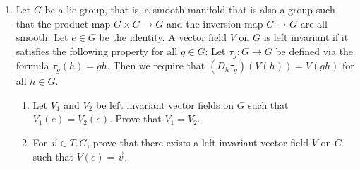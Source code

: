 \documentclass{article}
\begin{document}
\begin{enumerate}[label={\bf Q\arabic*:}]
\begin{enumerate}
\begin{proof}
          Then we have
          \begin{align*}
            \delta(f) &=\delta(f\restriction U) \\
              &=\delta(((f\circ\phi^{-1})\circ\phi)\restriction U) \\
              &=\delta(r+\sum_{i=1}^n(\pi_i\circ\phi)(f_i\circ\phi)) &
                (\because f\circ\phi^{-1} =r+\sum_{i=1}^n\pi_if_i) \\
              &=\delta(r+\sum_{i=1}^n\Pi_iF_i) & \\
              &=\delta(r)+\sum_{i=1}^n\delta(\Pi_iF_i) \\
              &=\sum_{i=1}^n\left[\delta(\Pi_i)F_i(p)
                +\Pi_i(p)\delta(F_i)\right] \\
              &=\sum_{i=1}^n\delta(\Pi_i)F_i(p) & (\because
                \Pi_i(p)=(\pi_i\circ\phi)(p)=\pi_i(\bar{0})=\bar{0}) \\
              &=\sum_{i=1}^n\delta(\Pi_i)(f_i\circ\phi)(p) \\
              &=\sum_{i=1}^n\delta(\Pi_i)f_i(\bar{0}) \\
              &=\sum_{i=1}^n\delta(\Pi_i)
                \left.\frac{\partial}{\partial
                x_i}\left[\sum_{j=1}^nx_jf_j(\bar{x})\right]\right
                \rvert_{\bar{0}} \\
              &=\sum_{i=1}^n\delta(\Pi_i)
                \left[\left.\frac{\partial(f\circ\phi^{-1})}{\partial
                x_i}\right\rvert_{\bar{0}}\right] \\
              &=D_p(f\circ\phi^{-1})(v) &(\text{for some}\;
                v=(\delta(\pi_1),\ldots,\delta(\pi_n))\in T_pM^n) \\
              &=\delta_{\vec{v}}(f). \\
          \end{align*}
          Thus, $\delta=\Psi(\vec{v})$, and since
          $\delta\in\text{Der}_pM^n$ was arbitrary, $\Psi$ is surjective.
        \end{proof}
    \end{enumerate}

  \item Let $G$ be a lie group, that is, a smooth manifold that is also a
    group such that the product map $G\times G\to G$ and the inversion map
    $G\to G$ are all smooth. Let $e\in G$ be the identity. A vector field
    $V$ on $G$ is left invariant if it satisfies the following property for
    all $g\in G$: Let $\tau_g:G\to G$ be defined via the formula
    $\tau_g(h)=gh$. Then we require that $(D_h\tau_g)(V(h))=V(gh)$ for all
    $h\in G$.

    \begin{enumerate}
      \item Let $V_1$ and $V_2$ be left invariant vector fields on $G$ such
        that $V_1(e)=V_2(e)$. Prove that $V_1=V_2$.
      \item For $\vec{v}\in T_eG$, prove that there exists a left invariant
        vector field $V$ on $G$ such that $V(e)=\vec{v}$.
    \end{enumerate}
\end{enumerate}
\end{document}
